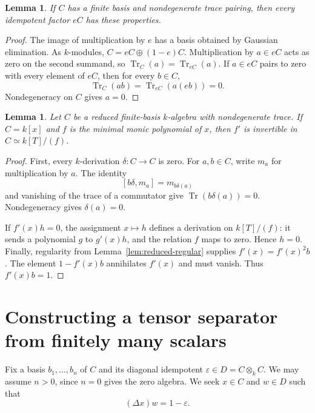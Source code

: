 \documentclass[11pt]{article}
\newtheorem{lemma}[theorem]{Lemma}
\theoremstyle{definition}
\theoremstyle{remark}
\newcommand{\Tr}{\operatorname{Tr}}
\newcommand{\eps}{\varepsilon}
\newcommand{\Del}{\Delta}
\begin{document}
\begin{lemma}\label{lem:corner-trace}
If $C$ has a finite basis and nondegenerate trace pairing, then every
idempotent factor $eC$ has these properties.
\end{lemma}
\begin{proof}
The image of multiplication by $e$ has a basis obtained by Gaussian
elimination. As $k$-modules,
$C=eC\oplus(1-e)C$. Multiplication by $a\in eC$ acts as zero on
the second summand, so $\Tr_C(a)=\Tr_{eC}(a)$.
If $a\in eC$ pairs to zero with every element of $eC$, then for
every $b\in C$,
\[
 \Tr_C(ab)=\Tr_{eC}(a(eb))=0.
\]
Nondegeneracy on $C$ gives $a=0$.
\end{proof}

\begin{lemma}\label{lem:monogenic-separable}
Let $C$ be a reduced finite-basis $k$-algebra with nondegenerate trace.
If $C=k[x]$ and $f$ is the minimal monic polynomial of $x$, then
$f'$ is invertible in $C\simeq k[T]/(f)$.
\end{lemma}
\begin{proof}
First, every $k$-derivation $\delta:C\to C$ is zero. For $a,b\in C$,
write $m_a$ for multiplication by $a$. The identity
\[
 [b\delta,m_a]=m_{b\delta(a)}
\]
and vanishing of the trace of a commutator give
$\Tr(b\delta(a))=0$. Nondegeneracy gives $\delta(a)=0$.

If $f'(x)h=0$, the assignment $x\mapsto h$ defines a derivation
on $k[T]/(f)$: it sends a polynomial $g$ to $g'(x)h$, and the
relation $f$ maps to zero. Hence $h=0$. Finally, regularity from
Lemma~\ref{lem:reduced-regular} supplies
$f'(x)=f'(x)^2b$. The element $1-f'(x)b$ annihilates $f'(x)$ and
must vanish. Thus $f'(x)b=1$.
\end{proof}

\section{Constructing a tensor separator from finitely many scalars}

Fix a basis $b_1,\ldots,b_n$ of $C$ and its diagonal idempotent
$\eps\in D=C\otimes_k C$. We may assume $n>0$, since $n=0$ gives
the zero algebra. We seek $x\in C$ and $w\in D$ such that
\begin{equation}\label{eq:separator}
 (\Del x)w=1-\eps.
\end{equation}
\end{document}
